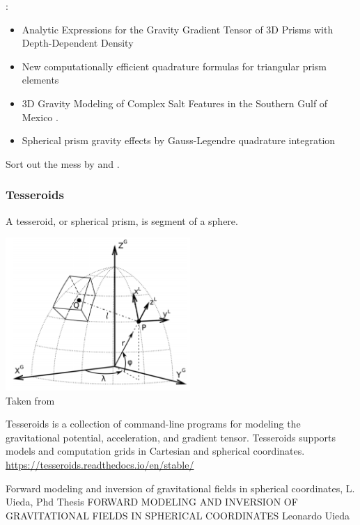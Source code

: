 \Literature:
\begin{itemize}
\item Analytic Expressions for the Gravity Gradient Tensor 
      of 3D Prisms with Depth-Dependent Density \cite{jilz18}
\item New computationally efficient quadrature formulas for triangular prism elements \cite{kuym13}
\item 3D Gravity Modeling of Complex Salt Features in the Southern Gulf of Mexico \cite{naoo16}.
\item Spherical prism gravity effects by Gauss-Legendre quadrature integration \cite{asvk07}
\end{itemize}

\bscthesis {} Sort out the mess by \cite{duti16} and \cite{zhhu17}.



\subsubsection{Tesseroids}

A tesseroid, or spherical prism, is segment of a sphere. 

\begin{center}
\includegraphics[width=7cm]{images/gravity/uibb11}\\
{\captionfont Taken from \cite{uibb11}}
\end{center}

Tesseroids is a collection of command-line programs for modeling the gravitational potential, 
acceleration, and gradient tensor. Tesseroids supports models and computation grids 
in Cartesian and spherical coordinates.
\url{https://tesseroids.readthedocs.io/en/stable/}



Forward modeling and inversion of gravitational fields in spherical coordinates, L. Uieda, Phd Thesis 
\cite{uied16}
FORWARD MODELING AND INVERSION OF GRAVITATIONAL FIELDS IN
SPHERICAL COORDINATES
Leonardo Uieda

